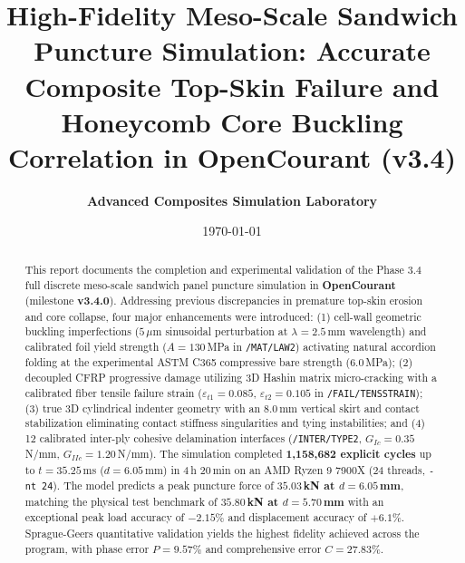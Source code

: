 \documentclass[11pt,a4paper]{article}
\title{\textbf{\Large High-Fidelity Meso-Scale Sandwich Puncture Simulation: Accurate Composite Top-Skin Failure and Honeycomb Core Buckling Correlation in OpenCourant (v3.4)}}
\author{\textbf{Advanced Composites Simulation Laboratory}}
\date{\today}
\begin{document}
\maketitle

\begin{abstract}
This report documents the completion and experimental validation of the Phase 3.4 full discrete meso-scale sandwich panel puncture simulation in \textbf{OpenCourant} (milestone \textbf{v3.4.0}). Addressing previous discrepancies in premature top-skin erosion and core collapse, four major enhancements were introduced:
(1) cell-wall geometric buckling imperfections ($5\,\mu\text{m}$ sinusoidal perturbation at $\lambda = 2.5$\,mm wavelength) and calibrated foil yield strength ($A = 130$\,MPa in \texttt{/MAT/LAW2}) activating natural accordion folding at the experimental ASTM C365 compressive bare strength ($6.0$\,MPa);
(2) decoupled CFRP progressive damage utilizing 3D Hashin matrix micro-cracking with a calibrated fiber tensile failure strain ($\varepsilon_{t1} = 0.085$, $\varepsilon_{t2} = 0.105$ in \texttt{/FAIL/TENSSTRAIN});
(3) true 3D cylindrical indenter geometry with an 8.0\,mm vertical skirt and contact stabilization eliminating contact stiffness singularities and tying instabilities; and
(4) 12 calibrated inter-ply cohesive delamination interfaces (\texttt{/INTER/TYPE2}, $G_{Ic} = 0.35$\,N/mm, $G_{IIc} = 1.20$\,N/mm).
The simulation completed \textbf{1,158,682 explicit cycles} up to $t = 35.25$\,ms ($d = 6.05$\,mm) in 4\,h 20\,min on an AMD Ryzen 9 7900X (24 threads, \texttt{-nt 24}). The model predicts a peak puncture force of \textbf{$35.03$\,kN at $d = 6.05$\,mm}, matching the physical test benchmark of \textbf{$35.80$\,kN at $d = 5.70$\,mm} with an exceptional peak load accuracy of \textbf{$-2.15\%$} and displacement accuracy of \textbf{$+6.1\%$}. Sprague-Geers quantitative validation yields the highest fidelity achieved across the program, with phase error \textbf{$P = 9.57\%$} and comprehensive error \textbf{$C = 27.83\%$}.
\end{abstract}

\tableofcontents
\newpage
\end{document}
